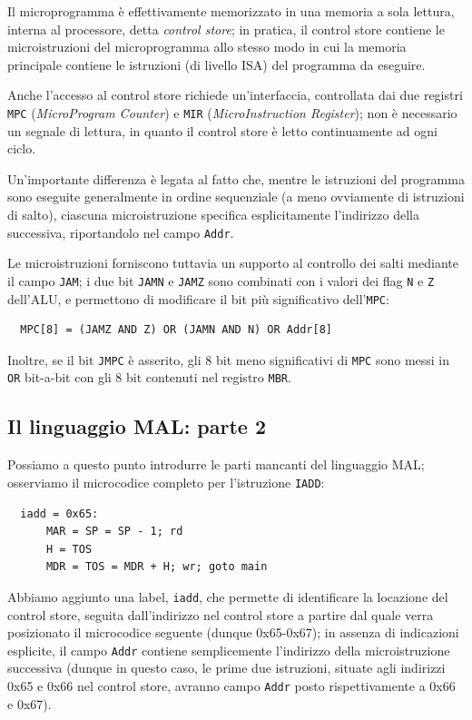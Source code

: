 \documentclass[a4paper,12pt]{scrreprt}
\begin{document}
Il microprogramma è effettivamente memorizzato in una memoria a sola lettura,
interna al processore, detta \textit{control store}; in pratica, il control
store contiene le microistruzioni del microprogramma allo stesso modo in cui la
memoria principale contiene le istruzioni (di livello ISA) del programma da
eseguire.

Anche l'accesso al control store richiede un'interfaccia, controllata dai due
registri \lstinline{MPC} (\textit{MicroProgram Counter}) e \lstinline{MIR}
(\textit{MicroInstruction Register}); non è necessario un segnale di lettura, in
quanto il control store è letto continuamente ad ogni ciclo.

Un'importante differenza è legata al fatto che, mentre le istruzioni del
programma sono eseguite generalmente in ordine sequenziale (a meno ovviamente di
istruzioni di salto), ciascuna microistruzione specifica esplicitamente
l'indirizzo della successiva, riportandolo nel campo \lstinline{Addr}.

Le microistruzioni forniscono tuttavia un supporto al controllo dei salti
mediante il campo \lstinline{JAM}; i due bit \lstinline{JAMN} e \lstinline{JAMZ}
sono combinati con i valori dei flag \lstinline{N} e \lstinline{Z} dell'ALU, e
permettono di modificare il bit più significativo dell'\lstinline{MPC}:

\begin{lstlisting}
  MPC[8] = (JAMZ AND Z) OR (JAMN AND N) OR Addr[8]
\end{lstlisting}

Inoltre, se il bit \lstinline{JMPC} è asserito, gli 8 bit meno significativi di
\lstinline{MPC} sono messi in \lstinline{OR} bit-a-bit con gli 8 bit contenuti
nel registro \lstinline{MBR}.

\subsection{Il linguaggio MAL: parte 2}

Possiamo a questo punto introdurre le parti mancanti del linguaggio MAL;
osserviamo il microcodice completo per l'istruzione \lstinline{IADD}:

\begin{lstlisting}
  iadd = 0x65:
      MAR = SP = SP - 1; rd
      H = TOS
      MDR = TOS = MDR + H; wr; goto main
\end{lstlisting}

Abbiamo aggiunto una label, \lstinline{iadd}, che permette di identificare la
locazione del control store, seguita dall'indirizzo nel control store a partire
dal quale verra posizionato il microcodice seguente (dunque 0x65-0x67); in
assenza di indicazioni esplicite, il campo \lstinline{Addr} contiene
semplicemente l'indirizzo della microistruzione successiva (dunque in questo
caso, le prime due istruzioni, situate agli indirizzi 0x65 e 0x66 nel control
store, avranno campo \lstinline{Addr} posto rispettivamente a 0x66 e 0x67).
\end{document}
